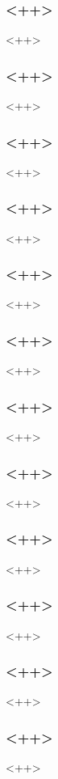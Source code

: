 \begin{frame}[fragile]
\frametitle{<++>}
<++>
\end{frame}

\begin{frame}[fragile]
\frametitle{<++>}
<++>
\end{frame}

\begin{frame}[fragile]
\frametitle{<++>}
<++>
\end{frame}

\begin{frame}[fragile]
\frametitle{<++>}
<++>
\end{frame}

\begin{frame}[fragile]
\frametitle{<++>}
<++>
\end{frame}

\begin{frame}[fragile]
\frametitle{<++>}
<++>
\end{frame}

\begin{frame}[fragile]
\frametitle{<++>}
<++>
\end{frame}

\begin{frame}[fragile]
\frametitle{<++>}
<++>
\end{frame}

\begin{frame}[fragile]
\frametitle{<++>}
<++>
\end{frame}

\begin{frame}[fragile]
\frametitle{<++>}
<++>
\end{frame}

\begin{frame}[fragile]
\frametitle{<++>}
<++>
\end{frame}

\begin{frame}[fragile]
\frametitle{<++>}
<++>
\end{frame}


